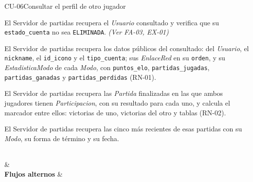 \begin{fichacu}{CU-06}{Consultar el perfil de otro jugador}
{\begin{cuenum}[start=1]
      \item El Servidor de partidas recupera el \textit{Usuario} consultado y verifica que su \texttt{estado\_\allowbreak{}cuenta} no sea \texttt{ELIMINADA}. \textit{(Ver \mbox{FA-03}, \mbox{EX-01})}
      \item El Servidor de partidas recupera los datos públicos del consultado: del \textit{Usuario}, el \texttt{nickname}, el \texttt{id\_\allowbreak{}icono} y el \texttt{tipo\_\allowbreak{}cuenta}; sus \textit{EnlaceRed} en su \texttt{orden}, y su \textit{EstadisticaModo} de cada \textit{Modo}, con \texttt{puntos\_\allowbreak{}elo}, \texttt{partidas\_\allowbreak{}jugadas}, \texttt{partidas\_\allowbreak{}ganadas} y \texttt{partidas\_\allowbreak{}perdidas} (\mbox{RN-01}).
      \item El Servidor de partidas recupera las \textit{Partida} finalizadas en las que ambos jugadores tienen \textit{Participacion}, con su resultado para cada uno, y calcula el marcador entre ellos: victorias de uno, victorias del otro y tablas (\mbox{RN-02}).
      \item El Servidor de partidas recupera las cinco más recientes de esas partidas con su \textit{Modo}, su forma de término y su fecha.
    \end{cuenum}} \\
   &  \\ \hline
  \textbf{Flujos alternos} & 
\end{fichacu}
